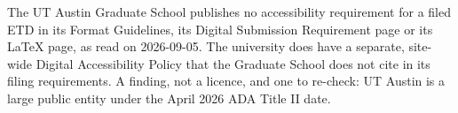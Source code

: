 %
	{The UT Austin Graduate School publishes no accessibility requirement for a
	 filed ETD in its Format Guidelines, its Digital Submission Requirement page
	 or its LaTeX page, as read on 2026-09-05. The university does have a
	 separate, site-wide Digital Accessibility Policy that the Graduate School
	 does not cite in its filing requirements. A finding, not a licence, and one
	 to re-check: UT Austin is a large public entity under the April 2026 ADA
	 Title II date.}

